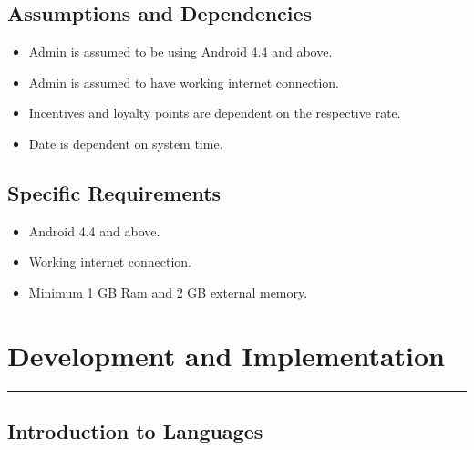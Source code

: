 \section{Assumptions and Dependencies}
\begin{itemize}
	\item Admin is assumed to be using Android 4.4 and above.
	\item Admin is assumed to have working internet connection.
	\item Incentives and loyalty points are dependent on the respective rate.
	\item Date is dependent on system time. 

\end{itemize}
\section{Specific Requirements}
\begin{itemize}
	\item Android 4.4 and above.
	\item Working internet connection.
	\item Minimum 1 GB Ram and 2 GB external memory.
\end{itemize}
\chapter{Development and Implementation}\hrule
\label{Chapter:4}
\section{Introduction to Languages}
